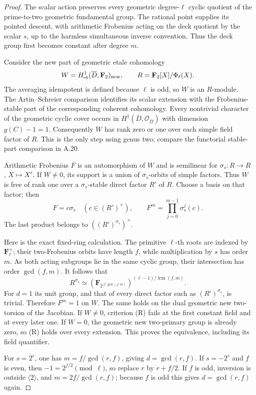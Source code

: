 \documentclass[11pt]{article}
\begin{document}
\begin{proof}
The scalar action preserves every geometric degree-\(\ell\)
cyclic quotient of the prime-to-two geometric fundamental
group. The rational point supplies its pointed descent,
with arithmetic Frobenius acting on the deck quotient
by the scalar \(s\), up to the harmless simultaneous
inverse convention. Thus the deck group first becomes
constant after degree \(m\).

Consider the new part of geometric etale cohomology
\[
 W=H^1_{\rm et}(\overline D,\mathbf F_2)_{\rm new},
 \qquad R=\mathbf F_2[X]/\Phi_\ell(X).
\]
The averaging idempotent is defined because \(\ell\)
is odd, so \(W\) is an \(R\)-module.
The Artin--Schreier comparison identifies its scalar
extension with the Frobenius-stable part of the
corresponding coherent cohomology. Every nontrivial
character of the geometric cyclic cover occurs in
\(H^1(\overline D,\mathcal O_{\overline D})\) with
dimension \(g(C)-1=1\). Consequently \(W\) has rank
zero or one over each simple field factor of \(R\).
This is the only step using genus two; compare the
functorial stable-part comparison in A.20.

Arithmetic Frobenius \(F\) is an automorphism of \(W\)
and is semilinear for
\(\sigma_s:R\to R\), \(X\mapsto X^s\).
If \(W\ne0\), its support is a union of \(\sigma_s\)-orbits
of simple factors. Thus \(W\) is free of rank one over a
\(\sigma_s\)-stable direct factor \(R'\) of \(R\).
Choose a basis on that factor; then
\[
                 F=c\sigma_s\quad(c\in(R')^\times),
 \qquad
                 F^m=\prod_{j=0}^{m-1}\sigma_s^j(c).
\]
The last product belongs to \(((R')^{\sigma_s})^\times\).

Here is the exact fixed-ring calculation. The primitive
\(\ell\)-th roots are indexed by
\(\mathbf F_\ell^\times\); their two-Frobenius orbits
have length \(f\), while multiplication by \(s\) has
order \(m\). As both acting subgroups lie in the same
cyclic group, their intersection has order \(\gcd(f,m)\).
It follows that
\[
 R^{\sigma_s}\simeq
 \left(\mathbf F_{2^{\,f/\gcd(f,m)}}\right)^{
                    (\ell-1)/\operatorname{lcm}(f,m)}.
\]
For \(d=1\) its unit group, and that of every direct
factor such as \((R')^{\sigma_s}\), is trivial.
Therefore \(F^m=1\) on \(W\).
The same holds on the dual geometric new two-torsion
of the Jacobian. If \(W\ne0\), criterion (R) fails at
the first constant field and at every later one. If
\(W=0\), the geometric new two-primary group is already
zero, so (R) holds over every extension. This proves the
equivalence, including its field quantifier.

For \(s=2^r\), one has \(m=f/\gcd(r,f)\), giving
\(d=\gcd(r,f)\). If \(s=-2^r\) and \(f\) is even,
then \(-1=2^{f/2}\pmod\ell\), so replace \(r\) by
\(r+f/2\). If \(f\) is odd, inversion is outside
\(\langle2\rangle\), and
\(m=2f/\gcd(r,f)\); because \(f\) is odd this gives
\(d=\gcd(r,f)\) again.
\end{proof}
\end{document}
